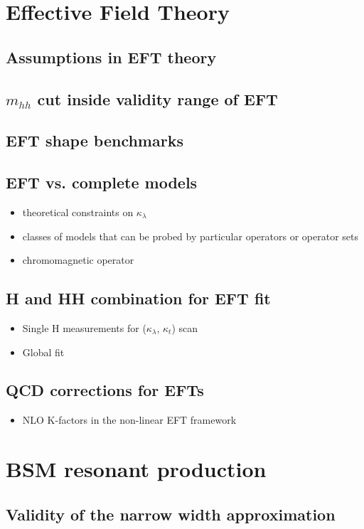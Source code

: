 \documentclass{book}
\begin{document}
\section{Effective Field Theory}
\subsection{Assumptions in EFT theory}

\subsection{$m_{hh}$ cut inside validity range of EFT}
\subsection{EFT shape benchmarks}
\subsection{EFT vs. complete models}
\begin{itemize}
\item theoretical constraints on $\kappa_\lambda$
\item classes of models that can be probed by particular operators or operator sets
\item chromomagnetic operator
\end{itemize}
\subsection{H and HH combination for EFT fit} 
\begin{itemize}
\item Single H measurements for ($\kappa_{\lambda}$, $\kappa_t$) scan
\item Global fit
\end{itemize}
\subsection{QCD corrections for EFTs}
\begin{itemize}
             \item NLO K-factors in the non-linear EFT framework
\end{itemize}


\section{BSM resonant production}
\subsection{Validity of the narrow width approximation}
\end{document}
